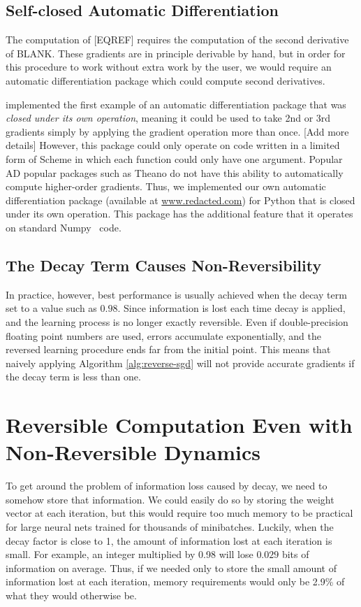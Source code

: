 \documentclass{article}
\begin{document}
\subsection{Self-closed Automatic Differentiation}

The computation of [EQREF] requires the computation of the second derivative of BLANK.
These gradients are in principle derivable by hand, but in order for this procedure to work without extra work by the user, we would require an automatic differentiation package which could compute second derivatives.

\citet{pearlmutter2008reverse} implemented the first example of an automatic differentiation package that was \emph{closed under its own operation}, meaning it could be used to take 2nd or 3rd gradients simply by applying the gradient operation more than once. [Add more details]
However, this package could only operate on code written in a limited form of Scheme in which each function could only have one argument.
Popular AD popular packages such as Theano do not have this ability to automatically compute higher-order gradients.
Thus, we implemented our own automatic differentiation package (available at \url{www.redacted.com}) for Python that is closed under its own operation.
This package has the additional feature that it operates on standard Numpy~\cite{oliphant2007python} code.

\subsection{The Decay Term Causes Non-Reversibility}
In practice, however, best performance is usually achieved when the decay term set to a value such as $0.98$.
Since information is lost each time decay is applied, and the learning process is no longer exactly reversible.
Even if double-precision floating point numbers are used, errors accumulate exponentially, and the reversed learning procedure ends far from the initial point.
This means that naively applying Algorithm \ref{alg:reverse-sgd} will not provide accurate gradients if the decay term is less than one.

\section{Reversible Computation Even with Non-Reversible Dynamics}

To get around the problem of information loss caused by decay, we need to somehow store that information.
We could easily do so by storing the weight vector at each iteration, but this would require too much memory to be practical for large neural nets trained for thousands of minibatches.
Luckily, when the decay factor is close to 1, the amount of information lost at each iteration is small.
For example, an integer multiplied by 0.98 will lose $0.029$ bits of information on average.
Thus, if we needed only to store the small amount of information lost at each iteration, memory requirements would only be 2.9\% of what they would otherwise be.
\end{document}

